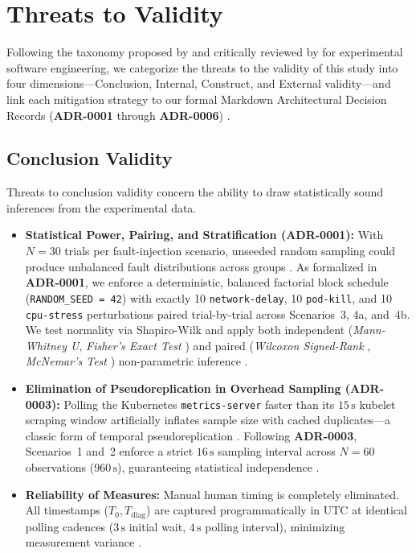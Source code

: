 \section{Threats to Validity}
\label{sec:threats-to-validity}

Following the taxonomy proposed by \cite{wohlin_2012} and critically reviewed by \cite{verdecchia_2023} for experimental software engineering, we categorize the threats to the validity of this study into four dimensions---Conclusion, Internal, Construct, and External validity---and link each mitigation strategy to our formal Markdown Architectural Decision Records (\textbf{ADR-0001} through \textbf{ADR-0006}) \cite{nygard_2011, kopp_2018}.

\subsection{Conclusion Validity}
Threats to conclusion validity concern the ability to draw statistically sound inferences from the experimental data.
\begin{itemize}
    \item \textbf{Statistical Power, Pairing, and Stratification (ADR-0001):} With $N=30$ trials per fault-injection scenario, unseeded random sampling could produce unbalanced fault distributions across groups \cite{wohlin_2012}. As formalized in \textbf{ADR-0001}, we enforce a deterministic, balanced factorial block schedule (\texttt{RANDOM\_SEED = 42}) with exactly 10 \texttt{network-delay}, 10 \texttt{pod-kill}, and 10 \texttt{cpu-stress} perturbations paired trial-by-trial across Scenarios~3, 4a, and~4b. We test normality via Shapiro-Wilk and apply both independent (\textit{Mann-Whitney U}, \textit{Fisher's Exact Test} \cite{agresti_2007}) and paired (\textit{Wilcoxon Signed-Rank} \cite{wilcoxon_1945}, \textit{McNemar's Test} \cite{mcnemar_1947}) non-parametric inference \cite{conover_1999}.
    \item \textbf{Elimination of Pseudoreplication in Overhead Sampling (ADR-0003):} Polling the Kubernetes \texttt{metrics-server} faster than its $15\,\text{s}$ kubelet scraping window artificially inflates sample size with cached duplicates---a classic form of temporal pseudoreplication \cite{hurlbert_1984}. Following \textbf{ADR-0003}, Scenarios~1 and~2 enforce a strict $16\,\text{s}$ sampling interval across $N=60$ observations ($960\,\text{s}$), guaranteeing statistical independence \cite{jain_1991, georges_2007}.
    \item \textbf{Reliability of Measures:} Manual human timing is completely eliminated. All timestamps ($T_0, T_{\text{diag}}$) are captured programmatically in UTC at identical polling cadences ($3\,\text{s}$ initial wait, $4\,\text{s}$ polling interval), minimizing measurement variance \cite{kitchenham_2002}.
\end{itemize}

